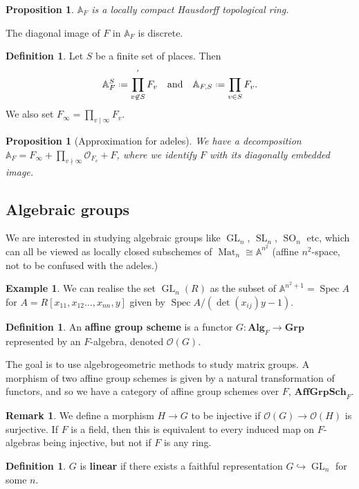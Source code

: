 \documentclass[11pt]{report}
\let\mbb\mathbb
\let\mc\mathcal
\let\mbf\mathbf
\newcommand{\1}{\mathbbm 1}
\newcommand{\A}{\mbb A}
\renewcommand{\O}{\mc O}
\newcommand{\Grp}{\mbf{Grp}}
\newcommand{\Alg}{\mbf{Alg}}
\newcommand*{\defeq}{\mathrel{\vcenter{\baselineskip0.5ex \lineskiplimit0pt
      \hbox{\scriptsize.}\hbox{\scriptsize.}}}%
  =}
\DeclareMathOperator{\Spec}{Spec}
\DeclareMathOperator{\SO}{SO}
\DeclareMathOperator{\SL}{SL}
\DeclareMathOperator{\GL}{GL}
\DeclareMathOperator{\Mat}{Mat}
\theoremstyle{plain}
\newcounter{ex}
\newtheorem{prop}[thm]{Proposition}
\theoremstyle{definition}
\newtheorem{mydef}[thm]{Definition}
\newtheorem{remark}[thm]{Remark}
\newtheorem{example}[thm]{Example}
\theoremstyle{remark}
\numberwithin{equation}{section}
\begin{document}
\begin{prop}
  $\A_{F}$ is a locally compact Hausdorff topological ring. 
\end{prop}
The diagonal image of $F$ in $\A_{F}$ is discrete.

\begin{mydef}
  Let $S$ be a finite set of places. Then
  \begin{equation}
    \label{eq:4}
    \A^{S}_{F} \defeq \prod_{v \not \in S}^{'} F_{v} \qq{and} \A_{F,S} \defeq
    \prod_{v \in S} F_{v}.
  \end{equation}
  We also set $F_{\infty} = \prod_{v \mid \infty}F_{v}$. 
\end{mydef}

\begin{prop}[Approximation for adeles]
We have a decomposition $\A_{F} = F_{\infty} + \prod_{v \nmid \infty} \O_{F_{v}}+ F$,
where we identify $F$ with its diagonally embedded image. 
\end{prop}


\subsection{Algebraic groups}
\label{sec:algebraic-groups}
We are interested in studying algebraic groups like $\GL_{n}$,
$\SL_{n}$, $\SO_{n}$ etc, which can all be viewed as locally closed
subschemes of $\Mat_{n} \cong \A^{n^{2}}$ (affine $n^{2}$-space, not to be
confused with the adeles.)

\begin{example}
  We can realise the set $\GL_{n}(R)$ as the subset of
  $\A^{n^{2}+1} = \Spec A$ for $A = R [x_{11},x_{12}\ldots, x_{nn},y]$
  given by $\Spec A / (\det(x_{ij})y-1)$. 
\end{example}


\begin{mydef}
An \textbf{affine group scheme} is a functor $G : \Alg_{F} \to \Grp$
represented by an $F$-algebra, denoted $\O(G)$.
\end{mydef}

The goal is to use algebrogeometric methods to study matrix groups.
A morphism of two affine group schemes is given by a natural
transformation of functors, and so we have a category of affine group
schemes over $F$, $\mbf{AffGrpSch}_{F}$.

\begin{remark}
  We define a morphism $H \to G$ to be injective if $\O(G) \to \O(H)$ is
  surjective. If $F$ is a field, then this is equivalent to every
  induced map on $F$-algebras being injective, but not if $F$ is any ring.
\end{remark}
\begin{mydef}
  $G$ is \textbf{linear} if there exists a faithful representation $G
  \hookrightarrow \GL_{n}$ for some $n$.
\end{mydef}
\end{document}
